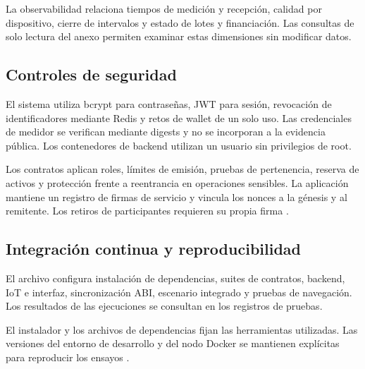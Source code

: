 La observabilidad relaciona tiempos de medición y recepción, calidad por dispositivo, cierre de intervalos y estado de lotes y financiación. Las consultas de solo lectura del anexo permiten examinar estas dimensiones sin modificar datos.

\subsection{Controles de seguridad}
El sistema utiliza bcrypt para contraseñas, JWT para sesión, revocación de identificadores mediante Redis y retos de wallet de un solo uso. Las credenciales de medidor se verifican mediante digests y no se incorporan a la evidencia pública. Los contenedores de backend utilizan un usuario sin privilegios de root.

Los contratos aplican roles, límites de emisión, pruebas de pertenencia, reserva de activos y protección frente a reentrancia en operaciones sensibles. La aplicación mantiene un registro de firmas de servicio y vincula los nonces a la génesis y al remitente. Los retiros de participantes requieren su propia firma \citep{security}.



\subsection{Integración continua y reproducibilidad}
El archivo  configura instalación de dependencias, suites de contratos, backend, IoT e interfaz, sincronización ABI, escenario integrado y pruebas de navegación. Los resultados de las ejecuciones se consultan en los registros de pruebas.

El instalador y los archivos de dependencias fijan las herramientas utilizadas. Las versiones del entorno de desarrollo y del nodo Docker se mantienen explícitas para reproducir los ensayos \citep{development}.
